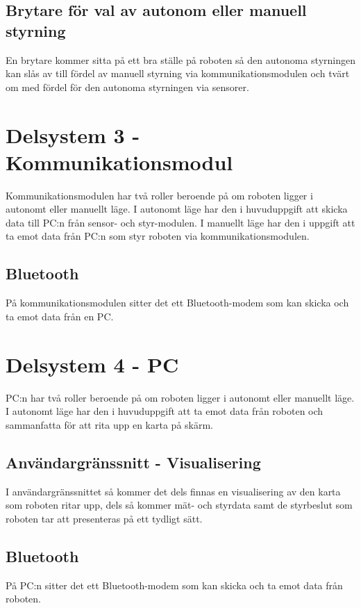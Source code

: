 \documentclass[11pt]{article}
\begin{document}
\begin{flushleft}
\subsection{Brytare för val av autonom eller manuell styrning}
En brytare kommer sitta på ett bra ställe på roboten så den autonoma styrningen kan slås av till fördel av manuell styrning via kommunikationsmodulen och tvärt om med fördel för den autonoma styrningen via sensorer.

\section{Delsystem 3 - Kommunikationsmodul}
Kommunikationsmodulen har två roller beroende på om roboten ligger i autonomt eller manuellt läge. I autonomt läge har den i huvuduppgift att skicka data till PC:n från sensor- och styr-modulen. I manuellt läge har den i uppgift att ta emot data från PC:n som styr roboten via kommunikationsmodulen.

\subsection{Bluetooth}
På kommunikationsmodulen sitter det ett Bluetooth-modem som kan skicka och ta emot data från en PC.  

\section{Delsystem 4 - PC}
PC:n har två roller  beroende på om roboten ligger i autonomt eller manuellt läge. I autonomt läge har den i huvuduppgift att ta emot data från roboten och sammanfatta för att rita upp en karta på skärm.

\subsection{Användargränssnitt - Visualisering}
I användargränssnittet så kommer det dels finnas en visualisering av den karta som roboten ritar upp, dels så kommer mät- och styrdata samt de styrbeslut som roboten tar att presenteras på ett tydligt sätt.

\subsection{Bluetooth}
På PC:n sitter det ett Bluetooth-modem som kan skicka och ta emot data från roboten.  




\end{flushleft}
\end{document}
